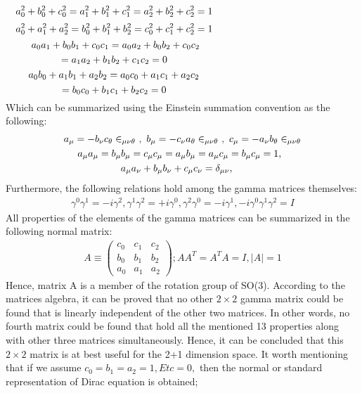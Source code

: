 \documentclass[twocolumn,aps,prb,showpacs]{revtex4-1}
\begin{document}
$$
a_{0}^{2}+b_{0}^{2}+c_{0}^{2}=a_{1}^{2}+b_{1}^{2}+c_{1}^{2}=a_{2}^{2}+b_{2}^{2}+c_{2}^{2}=1\hspace{4.9cm}
$$
$$ 
a_{0}^{2}+a_{1}^{2}+a_{2}^{2}=b_{0}^{2}+b_{1}^{2}+b_{2}^{2}=c_{0}^{2}+c_{1}^{2}+c_{2}^{2}=1 \hspace{4.9cm} $$
$$
a_{0}a_{1}+	b_{0}b_{1}+	c_{0}c_{1}= a_{0}a_{2}+	b_{0}b_{2}+	c_{0}c_{2}\hspace{4.8cm}$$
$$= a_{1}a_{2}+	b_{1}b_{2}+	c_{1}c_{2}=0\hspace{4.9cm}$$
$$ 
a_{0}b_{0}+	a_{1}b_{1}+	a_{2}b_{2}=	a_{0}c_{0}+	a_{1}c_{1}+	a_{2}c_{2}\hspace{4.9cm}$$
$$=b_{0}c_{0}+	b_{1}c_{1}+	b_{2}c_{2}=0\hspace{4.9cm}
$$
Which can be summarized using the Einstein summation convention as the following: 
\begin{align}
	a_{\mu}=-b_{\nu}c_{\theta}\in_{\mu\nu\theta}\ ,\ b_{\mu}=-c_{\nu}a_{\theta}\in_{\mu\nu\theta}\ ,\ c_{\mu}=-a_{\nu}b_{\theta}\in_{\mu\nu\theta}\notag \\
	a_{\mu}	a_{\mu}=b_{\mu}	b_{\mu}=c_{\mu}c_{\mu}	=a_{\mu}	b_{\mu}=a_{\mu}	c_{\mu}=b_{\mu}c_{\mu}=1,\ \ \ \ \ \	
	\notag \\	a_{\mu}	a_{\nu}+b_{\mu}	b_{\nu}	+c_{\mu}c_{\nu}	=\delta_{\mu\nu},\ \ \ \ \ \ \ \ \ \ \ \ \ \ \ \ \ \ \ \ \
\end{align}
Furthermore, the following relations hold among the gamma matrices themselves:
\begin{align}
	\gamma^{0}\gamma^{1}=-i\gamma^{2},	\gamma^{1}\gamma^{2}=+i\gamma^{0},	\gamma^{2}\gamma^{0}=-i\gamma^{1},-i\gamma^{0}\gamma^{1}\gamma^{2}=I
\end{align}
All properties of the elements of the gamma matrices can be summarized in the following normal matrix:
\begin{align}
	A\equiv 
	\begin{pmatrix}
		c_{0} & c_{1} & c_{2} \\
		b_{0} & b_{1} & b_{2} \\
		a_{0} & a_{1} & a_{2}
	\end{pmatrix};AA^{T} =A^{T}A=I, |A|=1
\end{align}
Hence, matrix A is a member of the rotation group of SO(3). According to the matrices algebra, it can be proved that no other $2\times2$ gamma matrix could be found that is linearly independent of the other two matrices. In other words, no fourth matrix could be found that hold all the mentioned 13 properties along with other three matrices simultaneously. Hence, it can be concluded that this $2\times2$ matrix is at best useful for the 2+1 dimension space. It worth mentioning that if we assume  $c_{0}=b_{1}=a_{2}=1,Etc=0,$ then the normal or standard representation of Dirac equation is obtained; 
\end{document}
